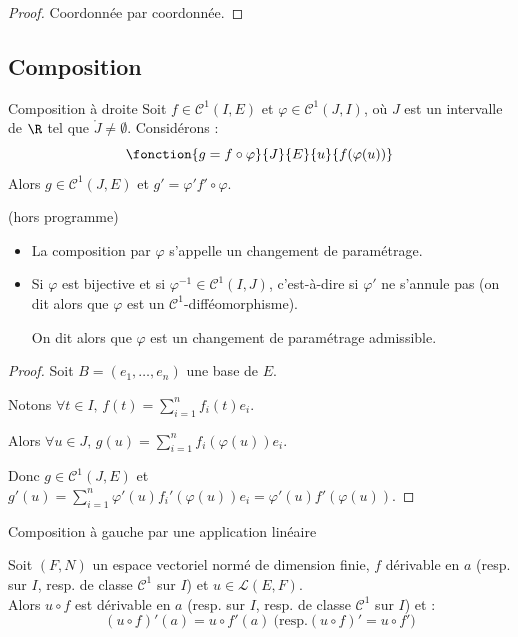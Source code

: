 \begin{proof}
    Coordonnée par coordonnée.
\end{proof}

\subsection{Composition}

\begin{proposition}{Composition à droite}{}
    Soit $f \in \mathscr C^1(I, E)$ et $\varphi \in \mathscr C^1(J, I)$, où $J$ est un intervalle de $\R$
    tel que $\mathring{J } \neq \emptyset$. 
    Considérons :
    \[\fonction{g = f \circ \varphi}{J}{E}{u}{f(\varphi(u))}\]
    Alors $g \in \mathscr C^1(J, E)$ et $g' = \varphi' f' \circ \varphi$.
\end{proposition}

\begin{remarque}
    (hors programme)
    \begin{itemize}
        \item La composition par $\varphi$ s'appelle un changement de paramétrage.

        \item Si $\varphi$ est bijective et si $\varphi^{-1} \in \mathscr C^1(I, J)$, c'est-à-dire si 
        $\varphi '$ ne s'annule pas (on dit alors que $\varphi$ est un $\mathscr C^1$-difféomorphisme). 

        On dit alors que $\varphi$ est un changement de paramétrage admissible.
    \end{itemize}
\end{remarque}

\begin{proof}
    Soit $B = (e_1, \ldots, e_n)$ une base de $E$. 

    Notons $\displaystyle \forall t \in I, \, f(t) = \sum_{i=1}^n f_i(t)e_i$. 

    Alors $\displaystyle \forall u \in J, \, g(u ) = \sum_{i=1}^n f_i(\varphi(u))e_i$. 

    Donc $g \in \mathscr C^1(J, E)$ et $\displaystyle g'(u) = \sum_{i=1}^n \varphi'(u)f_i'(\varphi(u))e_i = \varphi'(u)f'(\varphi(u))$.
\end{proof}

\begin{theoreme}{Composition à gauche par une application linéaire}{}

    Soit $(F, N)$ un espace vectoriel normé de dimension finie, $f$ dérivable en $a$
    (resp. sur $I$, resp. de classe $\mathscr C^1$ sur $I$) et $u \in \mathscr{L }(E, F)$. \\

    Alors $u \circ f$ est dérivable en $a$ (resp. sur $I$, resp. de classe $\mathscr C^1$ sur $I$) et :
    \[(u \circ f)'(a) = u \circ f'(a)~\text{(resp.} (u \circ f)' = u \circ f'\text{)}\]
\end{theoreme}

